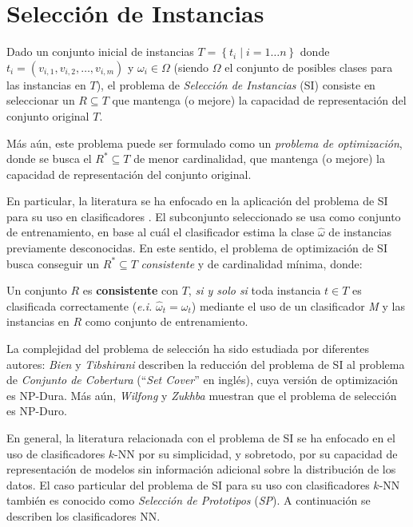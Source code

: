 \section{Selección de Instancias}

Dado un conjunto inicial de instancias $T = \left\{ t_i \mid i = 1 \dots n \right\}$ donde\linebreak $t_i = (v_{i,1}, v_{i,2}, \dots, v_{i,m})$ y $\omega_i \in \Omega$ (siendo $\Omega$ el conjunto de posibles clases para las instancias en $T$), el problema de \emph{Selección de Instancias} (SI) consiste en seleccionar un $R \subseteq T$ que mantenga (o mejore) la capacidad de representación del conjunto original $T$.

Más aún, este problema puede ser formulado como un \emph{problema de optimización}, donde se busca el $R^* \subseteq T$ de menor cardinalidad, que mantenga (o mejore) la capacidad de representación del conjunto original.

En particular, la literatura se ha enfocado en la aplicación del problema de SI para su uso en clasificadores \cite{DBLP:journals/corr/GottliebK14,DBLP:conf/jcdcg/Toussaint02}. El subconjunto seleccionado se usa como conjunto de entrenamiento, en base al cuál el clasificador estima la clase $\hat{\omega}$ de instancias previamente desconocidas. En este sentido, el problema de optimización de SI busca conseguir un $R^* \subseteq T$ \emph{consistente} y de cardinalidad mínima, donde:\\

\begin{definicion}
Un conjunto $R$ es \textbf{consistente} con $T$, \emph{si y solo si} toda instancia $t \in T$ es clasificada correctamente (\emph{e.i.} $\hat{\omega}_t = \omega_t$) mediante el uso de un clasificador \emph{M} y las instancias en $R$ como conjunto de entrenamiento.
\end{definicion}

La complejidad del problema de selección ha sido estudiada por diferentes autores: \emph{Bien} y \emph{Tibshirani} \cite{2012arXiv1202.5933B} describen la reducción del problema de SI al problema de \emph{Conjunto de Cobertura} (``\emph{Set Cover}'' en inglés), cuya versión de optimización es NP-Dura. Más aún, \emph{Wilfong} \cite{Wilfong:1991:NNP:109648.109673} y  \emph{Zukhba} \cite{Zukhba:2010:NPP:1921730.1921735} muestran que el problema de selección es NP-Duro.

En general, la literatura relacionada con el problema de SI se ha enfocado en el uso de clasificadores $k$-NN por su simplicidad, y sobretodo, por su capacidad de representación de modelos sin información adicional sobre la distribución de los datos. El caso particular del problema de SI para su uso con clasificadores $k$-NN también es conocido como \emph{Selección de Prototipos} (\emph{SP}). A continuación se describen los clasificadores NN.

